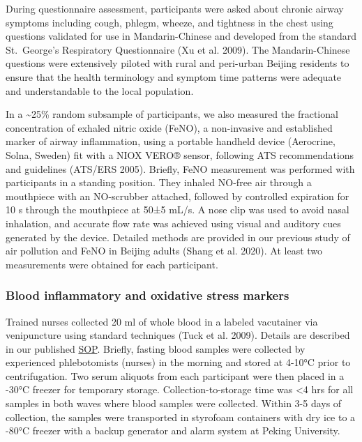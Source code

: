 \documentclass[
  letterpaper,
  DIV=11,
  numbers=noendperiod]{scrartcl}
\begin{document}
During questionnaire assessment, participants were asked about chronic
airway symptoms including cough, phlegm, wheeze, and tightness in the
chest using questions validated for use in Mandarin-Chinese and
developed from the standard St.~George's Respiratory Questionnaire (Xu
et al. 2009). The Mandarin-Chinese questions were extensively piloted
with rural and peri-urban Beijing residents to ensure that the health
terminology and symptom time patterns were adequate and understandable
to the local population.

In a \textasciitilde25\% random subsample of participants, we also
measured the fractional concentration of exhaled nitric oxide (FeNO), a
non-invasive and established marker of airway inflammation, using a
portable handheld device (Aerocrine, Solna, Sweden) fit with a NIOX
VERO® sensor, following ATS recommendations and guidelines (ATS/ERS
2005). Briefly, FeNO measurement was performed with participants in a
standing position. They inhaled NO-free air through a mouthpiece with an
NO-scrubber attached, followed by controlled expiration for 10 s through
the mouthpiece at 50±5 mL/s. A nose clip was used to avoid nasal
inhalation, and accurate flow rate was achieved using visual and
auditory cues generated by the device. Detailed methods are provided in
our previous study of air pollution and FeNO in Beijing adults (Shang et
al. 2020). At least two measurements were obtained for each participant.

\subsubsection{Blood inflammatory and oxidative stress
markers}\label{blood-inflammatory-and-oxidative-stress-markers}

Trained nurses collected 20 ml of whole blood in a labeled vacutainer
via venipuncture using standard techniques (Tuck et al. 2009). Details
are described in our published \href{https://osf.io/zwpfg}{SOP}.
Briefly, fasting blood samples were collected by experienced
phlebotomists (nurses) in the morning and stored at 4-10°C prior to
centrifugation. Two serum aliquots from each participant were then
placed in a -30°C freezer for temporary storage. Collection-to-storage
time was \textless4 hrs for all samples in both waves where blood
samples were collected. Within 3-5 days of collection, the samples were
transported in styrofoam containers with dry ice to a -80°C freezer with
a backup generator and alarm system at Peking University.
\end{document}
